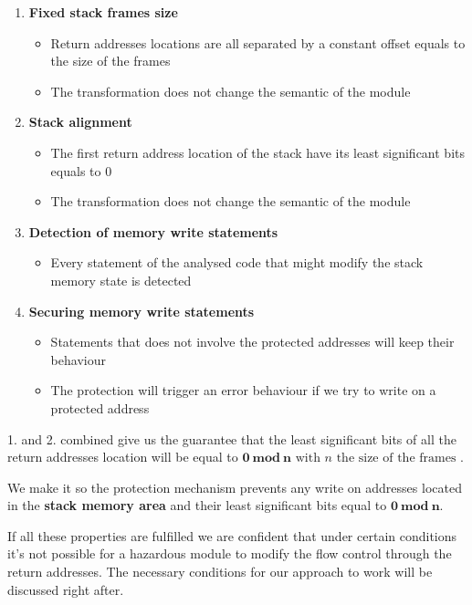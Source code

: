 \documentclass[11pt]{sdm}
\begin{document}
\begin{enumerate}
	\item \textbf{Fixed stack frames size}
		\begin{itemize}
			\item Return addresses locations are all separated by a constant offset equals to the size of the frames
			\item The transformation does not change the semantic of the module 
		\end{itemize}
	\item \textbf{Stack alignment}
		\begin{itemize}
			\item The first return address location of the stack have its least significant bits equals to 0
			\item The transformation does not change the semantic of the module 
		\end{itemize}
	\item \textbf{Detection of memory write statements}
		\begin{itemize}
			\item Every statement of the analysed code that might modify the stack memory state is detected
		\end{itemize}
	\item \textbf{Securing memory write statements}
		\begin{itemize}
			\item Statements that does not involve the protected addresses will keep their behaviour
			\item The protection will trigger an error behaviour if we try to write on a protected address
		\end{itemize}
\end{enumerate}

1. and 2. combined give us the guarantee that the least significant bits of all the return addresses location will be equal to $\mathbf{0~mod~n} \text{ with } n \text{ the size of the frames }$.

\hfill \break 
We make it so the protection mechanism prevents any write on addresses located in the \textbf{stack memory area} and their least significant bits equal to $\mathbf{0~mod~n}$.

\hfill \break 
If all these properties are fulfilled we are confident that under certain conditions it's not possible for a hazardous module to modify the flow control through the return addresses.
The necessary conditions for our approach to work will be discussed right after.
\end{document}
